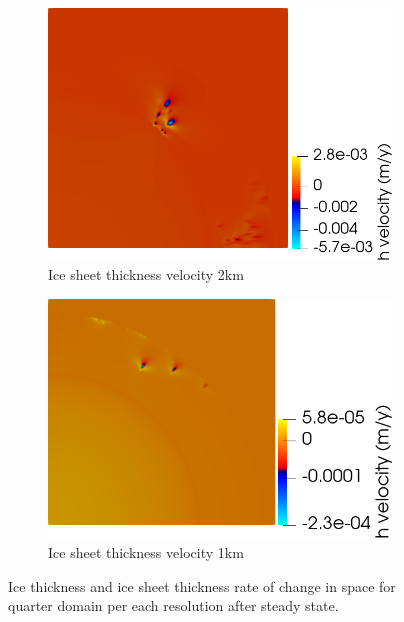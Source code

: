 \documentclass{article}
\begin{document}
\begin{figure}[!h]
\begin{minipage}[t]{.45\textwidth}
\begin{subfigure}{\textwidth}
			\includegraphics[width=\linewidth]{../fig/2km_quarter_cone_hvelocity_sin_fondo.png}
			\caption{Ice sheet thickness velocity 2km}
			\label{hvelocity2km}
		\end{subfigure}
				\begin{subfigure}{\textwidth}
			\includegraphics[width=\linewidth]{../fig/1km_quarter_cone_hvelocity_sin_fondo.png}
			\caption{Ice sheet thickness velocity 1km}
			\label{hvelocity1km}
		\end{subfigure}	
	\end{minipage}
	\caption{Ice thickness and ice sheet thickness rate of change in space for quarter domain per each resolution after steady state.}
	\label{h_and_h_velocities_cone}
\end{figure}
\end{document}
